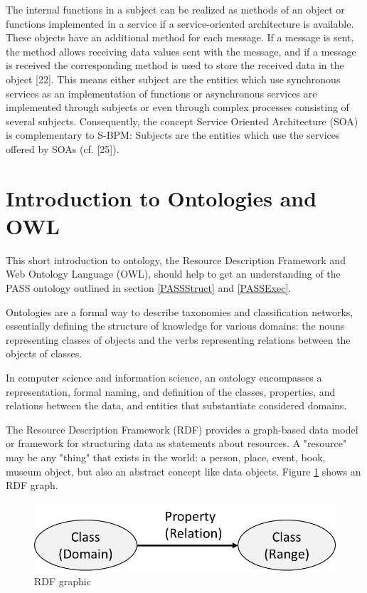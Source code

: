 The internal functions in a subject can be realized as methods of an object or functions implemented in a service if a service-oriented architecture is available. These objects have an additional method for each message. If a message is sent, the method allows receiving data values sent with the message, and if a message is received the corresponding method is used to store the received data in the object [22]. This means either subject are the entities which use synchronous services as an implementation of functions or asynchronous services are implemented through subjects or even through complex processes consisting of several subjects. Consequently, the concept Service Oriented Architecture (SOA) is complementary to S-BPM: Subjects are the entities which use the services offered by SOAs (cf. [25]).

\section{Introduction to Ontologies and OWL }
\label{IntroOntology}

This short introduction to ontology, the Resource Description Framework and Web Ontology Language (OWL), should help to get an understanding of the PASS ontology outlined in section \ref{PASSStruct} and \ref{PASSExec}.

Ontologies are a formal way to describe taxonomies and classification networks, essentially defining the structure of knowledge for various domains: the nouns representing classes of objects and the verbs representing relations between the objects of classes.

In computer science and information science, an ontology encompasses a representation, formal naming, and definition of the classes, properties, and relations between the data, and entities that substantiate considered domains.

The Resource Description Framework (RDF) provides a graph-based data model or framework for structuring data as statements about resources. A "resource" may be any "thing" that exists in the world: a person, place, event, book, museum object, but also an abstract concept like data objects. Figure \ref{fig:classes-properties}  shows an RDF graph.

\begin{figure}[h]
	\centering
	\includegraphics[width=0.6\linewidth]{Figures/Ontology/Introduction/Classes-Properties}
	\caption[RDF graphic]{RDF graphic}
	\label{fig:classes-properties}
\end{figure}

